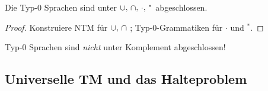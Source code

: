 {\begin{Satz}[name={[Abgeschlossenheit von Typ-0 Sprachen]}]\label{satz:Typ-0-abgeschl}
	Die Typ-0 Sprachen sind unter $\thinmuskip=6mu\cup,\cap,\cdot,{}^*$ abgeschlossen.
\end{Satz}
\begin{proof}
	Konstruiere \ac{NTM} für $\thinmuskip=6mu\cup,\cap$ ; Typ-0-Grammatiken für $\cdot$ und $^*$.
\end{proof}

\begin{Bem}
	Typ-0 Sprachen sind \emph{nicht} unter Komplement abgeschlossen!
\end{Bem}
}

\subsection{Universelle \acs*{TM} und das Halteproblem}





